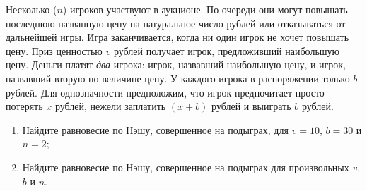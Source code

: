 \begin{problem}[<<Лохотрон-??>>]
\begin{source} \cite{shubik:doll} \end{source}
Несколько  ($n$)  игроков участвуют в аукционе. По очереди они могут повышать последнюю названную цену на натуральное число рублей или отказываться от дальнейшей игры. Игра заканчивается, когда ни один игрок не хочет повышать цену. Приз ценностью  $v$  рублей получает игрок, предложивший наибольшую цену. Деньги платят {\it два} игрока: игрок, назвавший наибольшую цену, и игрок, назвавший вторую по величине цену. У каждого игрока в распоряжении только  $b$  рублей. Для однозначности предположим, что игрок предпочитает просто потерять  $x$  рублей, нежели заплатить  $\left(x+b\right)$  рублей и выиграть  $b$  рублей.\par
\begin{enumerate}
\item  Найдите равновесие по Нэшу, совершенное на подыграх, для  $v=10$,  $b=30$  и  $n=2$;\par
\item Найдите равновесие по Нэшу, совершенное на подыграх для произвольных  $v$,  $b$  и  $n$.\par
\end{enumerate}


\begin{sol}
\end{sol}
\end{problem}



